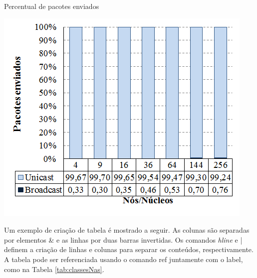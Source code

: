 \begin{grafico}[H]
  \setlength{\abovecaptionskip}{5pt}
  \setlength{\belowcaptionskip}{0pt}
  \caption[Percentual de pacotes enviados]
	  {Percentual de pacotes enviados}
  \centering
  \includegraphics[width=.48\textwidth]{imagem/graficos/grafico_pacotes_enviados_bt.png}
  \captionsetup[grafico]{justification=centering}
  \end{grafico}

  

Um exemplo de criação de tabela é mostrado a seguir. As colunas são separadas por elementos \& e as linhas por duas barras invertidas. 
  Os comandos \textit{hline} e | definem a criação de linhas e colunas para separar os conteúdos, respectivamente. A tabela pode
  ser referenciada usando o comando ref juntamente com o label, como na Tabela \ref{tab:classesNas}. 

